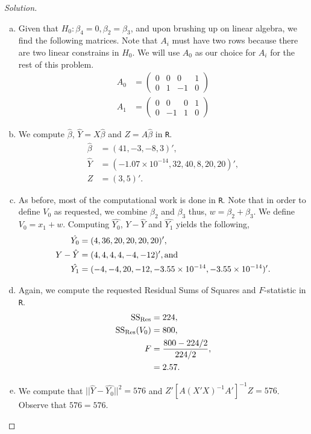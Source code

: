 \documentclass{amsart}\usepackage[]{graphicx}\usepackage[]{color}
\newcommand{\ssr}{{\rm SS}_{{\rm Res}}}
\begin{document}
		\begin{proof}[Solution]






			\begin{enumerate}[(a)]
				\item Given that $H_{0} : \beta_{4} = 0, \beta_{2} = \beta_{3}$, and upon brushing up on linear algebra, we find the following matrices.
				Note that $A_{i}$ must have two rows because there are two linear constrains in $H_{0}$.
				We will use $A_{0}$ as our choice for $A_{i}$ for the rest of this problem.
					\begin{align*}
						A_{0} &= \begin{pmatrix}
							0 & 0 & 0 & 1 \\
							0 & 1 & -1 & 0
						\end{pmatrix} \\
						A_{1} &= \begin{pmatrix}
							0 & 0 & 0 & 1 \\
							0 & -1 & 1 & 0
						\end{pmatrix}
					\end{align*}
				\item We compute $\hat{\beta}$, $\hat{Y} = X \hat{\beta}$ and $Z = A\hat{\beta}$ in \verb|R|.
					\begin{align*}
					    \hat{\beta} &= (41, -3, -8, 3)', \\
					    \hat{Y} &= (\ensuremath{-1.07\times 10^{-14}}, 32, 40, 8, 20, 20)', \\
					    Z &= (3, 5)'.
					\end{align*}
				\item As before, most of the computational work is done in \verb|R|.
				Note that in order to define $V_{0}$ as requested, we combine $\beta_{2}$ and $\beta_{3}$ thus, $w = \beta_{2} + \beta_{3}$.
				We define $V_{0} = x_{1} + w$.
				Computing $\hat{Y_{0}}$, $Y - \hat{Y}$ and $\hat{Y_{1}}$ yields the following,
				    \begin{align*}
				        \hat{Y_{0}} &= (4, 36, 20, 20, 20, 20)', \\
				        Y - \hat{Y} &= (4, 4, 4, 4, -4, -12)', \rm and \\
				        \hat{Y_{1}} &= (-4, -4, 20, -12, \ensuremath{-3.55\times 10^{-14}}, \ensuremath{-3.55\times 10^{-14}})'.
				    \end{align*}
				\item Again, we compute the requested Residual Sums of Squares and $F$-statistic in \verb|R|.
				    \begin{align*}
				        \ssr &= 224, \\
				        \ssr(V_{0}) &= 800, \\
				        F &= \frac{800 - 224/2}{224/2}, \\
				        &= 2.57.
				    \end{align*}
				\item We compute that $||\hat{Y} - \hat{Y_{0}}||^{2} = 576$ and $Z'[A(X'X)^{-1}A']^{-1}Z = 576$.
				Observe that $576 = 576$.
			\end{enumerate}
		\end{proof}
\end{document}
